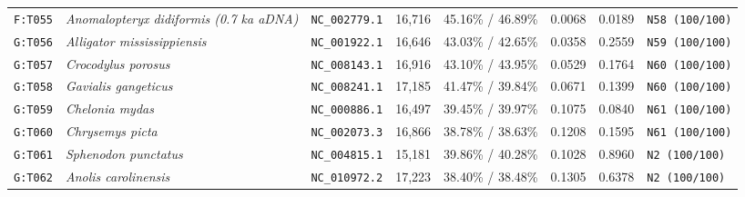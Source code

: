 \documentclass[10pt,letterpaper]{article}
\begin{document}
\begin{longtable}{llllllll}
\texttt{F:T055} & \textit{\textdagger{}Anomalopteryx didiformis (0.7 ka aDNA)} & \texttt{NC\_002779.1} & 16,716 & 45.16\% / 46.89\% & 0.0068 & 0.0189 & \texttt{N58 (100/100)} \\
\texttt{G:T056} & \textit{Alligator mississippiensis} & \texttt{NC\_001922.1} & 16,646 & 43.03\% / 42.65\% & 0.0358 & 0.2559 & \texttt{N59 (100/100)} \\
\texttt{G:T057} & \textit{Crocodylus porosus} & \texttt{NC\_008143.1} & 16,916 & 43.10\% / 43.95\% & 0.0529 & 0.1764 & \texttt{N60 (100/100)} \\
\texttt{G:T058} & \textit{Gavialis gangeticus} & \texttt{NC\_008241.1} & 17,185 & 41.47\% / 39.84\% & 0.0671 & 0.1399 & \texttt{N60 (100/100)} \\
\texttt{G:T059} & \textit{Chelonia mydas} & \texttt{NC\_000886.1} & 16,497 & 39.45\% / 39.97\% & 0.1075 & 0.0840 & \texttt{N61 (100/100)} \\
\texttt{G:T060} & \textit{Chrysemys picta} & \texttt{NC\_002073.3} & 16,866 & 38.78\% / 38.63\% & 0.1208 & 0.1595 & \texttt{N61 (100/100)} \\
\texttt{G:T061} & \textit{Sphenodon punctatus} & \texttt{NC\_004815.1} & 15,181 & 39.86\% / 40.28\% & 0.1028 & 0.8960 & \texttt{N2 (100/100)} \\
\texttt{G:T062} & \textit{Anolis carolinensis} & \texttt{NC\_010972.2} & 17,223 & 38.40\% / 38.48\% & 0.1305 & 0.6378 & \texttt{N2 (100/100)} \\
\bottomrule
\end{longtable}
\end{document}
